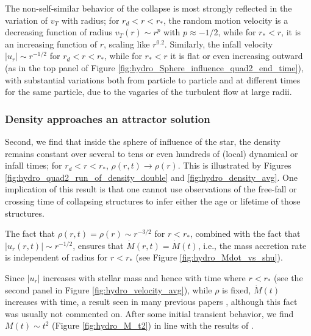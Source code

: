 \documentclass[../dissertation.tex]{subfiles}
\begin{document}
The non-self-similar behavior of the collapse is most strongly reflected in the
variation of $v_T$ with radius; for $r_d<r<r_*$, the 
random motion velocity is a decreasing function of radius 
$v_T(r)\sim r^{p}$ with $p\approx -1/2$, while for $r_*<r$, it is
an increasing function of $r$, scaling like $r^{0.2}$.
Similarly, the infall velocity $|u_r|\sim r^{-1/2}$ for $r_d<r<r_*$,  
while for $r_*<r$ it is flat or even increasing outward (as in the top 
panel of Figure \ref{fig:hydro_Sphere_influence_quad2_end_time}), 
with substantial variations both from particle to particle and at different times
for the same particle, due to the vagaries of the turbulent flow at large radii. 

\subsubsection{Density approaches an attractor solution}
Second, we find that inside the sphere of influence of the star, the density 
remains constant over several to tens or even hundreds of (local) dynamical 
or infall times;  for $r_d<r<r_*$, $\rho(r,t)\to\rho(r)$. This is illustrated 
by Figures \ref{fig:hydro_quad2_run_of_density_double} and \ref{fig:hydro_density_avg}. 
One implication of this result is that one cannot use observations of the 
free-fall or crossing time of collapsing structures to infer either the age 
or lifetime of those structures.

The fact that $\rho(r,t)=\rho(r)\sim r^{-3/2}$ for $r<r_*$, combined
with the fact that $|u_r(r,t)|\sim r^{-1/2}$,  ensures that $\dot
M(r,t)=\dot M(t)$, i.e., the mass accretion rate is independent of
radius for $r<r_*$ (see Figure
\ref{fig:hydro_Mdot_vs_shu}). 

Since $|u_r|$ increases with stellar mass and hence with time where $r<r_*$ 
(see the second panel in Figure \ref{fig:hydro_velocity_avg}), while $\rho$ is fixed, 
$\dot M(t)$ increases with time, a result seen in many previous papers \citep{2011ApJ...730...40P,2012MNRAS.419.3115B,2012ApJ...754...71K,
2012ApJ...761..156F,2014MNRAS.439.3420M}, 
although this fact was usually not commented on. After some initial transient 
behavior, we find $M(t)\sim t^2$ (Figure \ref{fig:hydro_M_t2}) in line with the results of \citet{2015ApJ...800...49L}.
\end{document}
